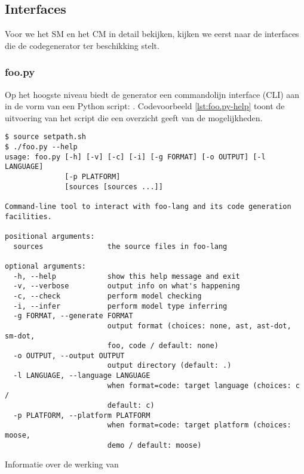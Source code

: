 
\subsection{Interfaces}
\label{subsection:devel-codegen-interfaces}

Voor we het SM en het CM in detail bekijken, kijken we eerst naar de interfaces
die de codegenerator ter beschikking stelt.

\subsubsection{foo.py}

Op het hoogste niveau biedt de generator een commandolijn interface (CLI) aan
in de vorm van een Python script: . Codevoorbeeld \ref{lst:foo.py-help}
toont de uitvoering van het script die een overzicht geeft van de mogelijkheden.

\begin{listing}[ht]
  \begin{verbatim}
$ source setpath.sh
$ ./foo.py --help
usage: foo.py [-h] [-v] [-c] [-i] [-g FORMAT] [-o OUTPUT] [-l LANGUAGE]
              [-p PLATFORM]
              [sources [sources ...]]

Command-line tool to interact with foo-lang and its code generation
facilities.

positional arguments:
  sources               the source files in foo-lang

optional arguments:
  -h, --help            show this help message and exit
  -v, --verbose         output info on what's happening
  -c, --check           perform model checking
  -i, --infer           perform model type inferring
  -g FORMAT, --generate FORMAT
                        output format (choices: none, ast, ast-dot, sm-dot,
                        foo, code / default: none)
  -o OUTPUT, --output OUTPUT
                        output directory (default: .)
  -l LANGUAGE, --language LANGUAGE
                        when format=code: target language (choices: c /
                        default: c)
  -p PLATFORM, --platform PLATFORM
                        when format=code: target platform (choices: moose,
                        demo / default: moose)
  \end{verbatim}
  \vspace{-5mm}
  \caption{Informatie over de werking van }
  \label{lst:foo.py-help}
\end{listing}

